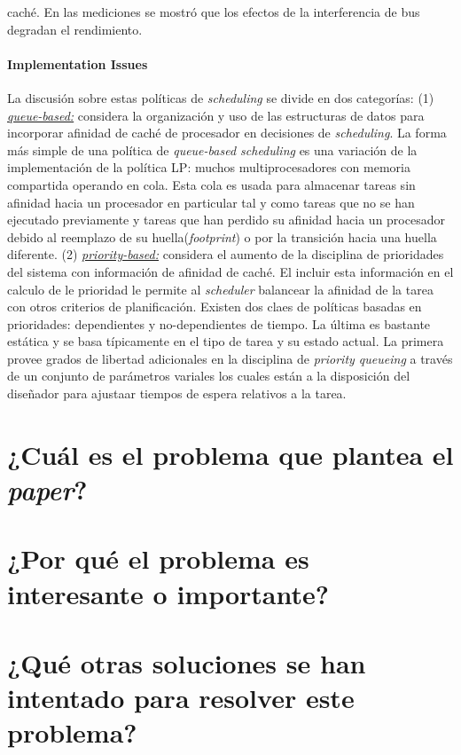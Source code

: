 caché. En las mediciones se mostró que los efectos de la interferencia de bus degradan el rendimiento. 

\paragraph{\textnormal{\textbf{Implementation Issues}}}
La discusión sobre estas políticas de \textit{scheduling} se divide en dos categorías: (1) \underline{\textit{queue-based:}} considera la organización y uso de las estructuras de datos para incorporar afinidad de caché de procesador en decisiones de \textit{scheduling}. La forma más simple de una política de \textit{queue-based scheduling} es una variación de la implementación de la política LP: muchos  multiprocesadores con memoria compartida operando en cola. Esta cola es usada para almacenar tareas sin afinidad hacia un procesador en particular tal y como tareas que no se han ejecutado previamente y tareas que han perdido su afinidad hacia un procesador debido al reemplazo de su huella(\textit{footprint}) o por la transición hacia una huella diferente. (2) \underline{\textit{priority-based:}} considera el aumento de la disciplina de prioridades del sistema con información de afinidad de caché. El incluir esta información en el calculo de le prioridad le permite al \textit{scheduler} balancear la afinidad de la tarea con otros criterios de planificación. Existen dos claes de políticas basadas en prioridades: dependientes y no-dependientes de tiempo. La última es bastante estática y se basa típicamente en el tipo de tarea y su estado actual. La primera provee grados de libertad adicionales en la disciplina de \textit{priority queueing} a través de un conjunto de parámetros variales los cuales están a la disposición del diseñador para ajustaar tiempos de espera relativos a la tarea.

\section{¿Cuál es el problema que plantea el \textit{paper}?}

\section{¿Por qué el problema es interesante o importante?}

\section{¿Qué otras soluciones se han intentado para resolver este problema?}
     
